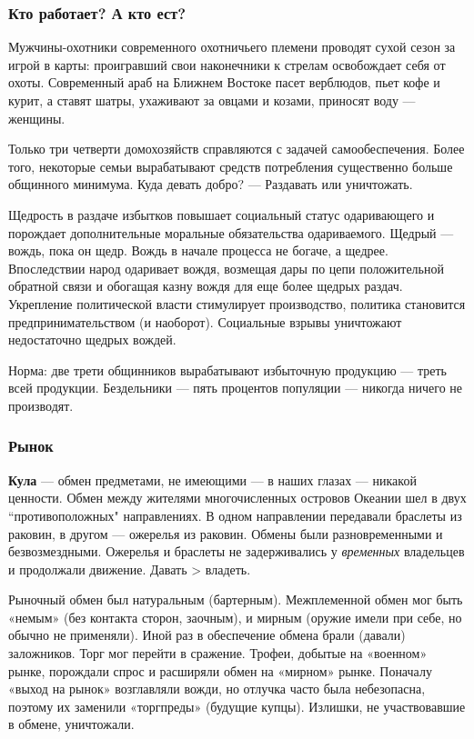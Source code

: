 \subsubsection[Кто работает? А кто ест?]{Кто работает? А кто ест?}

Мужчины-охотники современного охотничьего племени проводят сухой сезон за игрой в карты: проигравший свои наконечники к
стрелам освобождает себя от охоты. Современный араб на Ближнем Востоке пасет верблюдов, пьет кофе и курит, а ставят
шатры, ухаживают за овцами и козами, приносят воду — женщины.

Только три четверти домохозяйств справляются с задачей самообеспечения. Более того, некоторые семьи вырабатывают средств
потребления существенно больше общинного минимума. Куда девать добро? — Раздавать или уничтожать.

Щедрость в раздаче избытков повышает социальный статус одаривающего и порождает дополнительные моральные обязательства
одариваемого. Щедрый — вождь, пока он щедр. Вождь в начале процесса не богаче, а щедрее. Впоследствии народ одаривает
вождя, возмещая дары по цепи положительной обратной связи и обогащая казну вождя для еще более щедрых раздач.
Укрепление политической власти стимулирует производство, политика становится предпринимательством (и наоборот).
Социальные взрывы уничтожают недостаточно щедрых вождей.

Норма: две трети общинников вырабатывают избыточную продукцию — треть всей продукции. Бездельники — пять процентов
популяции — никогда ничего не производят.

\subsubsection[Рынок]{Рынок}
\textbf{Кула }— обмен предметами, не имеющими — в наших глазах — никакой ценности. Обмен между жителями многочисленных
островов Океании шел в двух ``противоположных" направлениях. В одном направлении передавали
браслеты из раковин, в другом — ожерелья из раковин. Обмены были разновременными и безвозмездными. Ожерелья и браслеты
не задерживались у \textit{временных} владельцев и продолжали движение. Давать
\foreignlanguage{english}{{\textgreater}} владеть.

Рыночный обмен был натуральным (бартерным). Межплеменной обмен мог быть «немым» (без контакта сторон, заочным), и мирным
(оружие имели при себе, но обычно не применяли). Иной раз в обеспечение обмена брали (давали) заложников. Торг мог
перейти в сражение. Трофеи, добытые на «военном» рынке, порождали спрос и расширяли обмен на «мирном» рынке. Поначалу
«выход на рынок» возглавляли вожди, но отлучка часто была небезопасна, поэтому их заменили «торгпреды» (будущие купцы).
Излишки, не участвовавшие в обмене, уничтожали.

